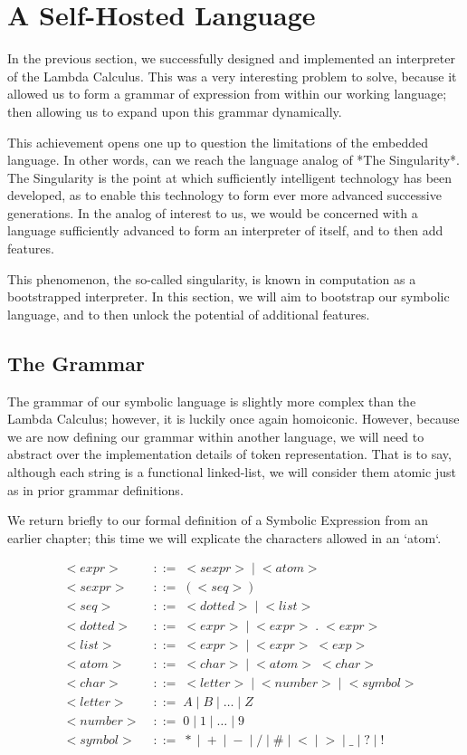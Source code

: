
\chapter{A Self-Hosted Language}
In the previous section, we successfully designed and implemented an
interpreter of the Lambda Calculus. This was a very interesting problem to
solve, because it allowed us to form a grammar of expression from within our working language; then allowing us to expand upon this grammar dynamically.

This achievement opens one up to question the limitations of the embedded
language. In other words, can we reach the language analog of *The 
Singularity*. The Singularity is the point at which sufficiently intelligent 
technology has been developed, as to enable this technology to form ever more 
advanced successive generations. In the analog of interest to us, we would be 
concerned with a language sufficiently advanced to form an interpreter of 
itself, and to then add features.

This phenomenon, the so-called singularity, is known in computation as a 
bootstrapped interpreter. In this section, we will aim to bootstrap our 
symbolic language, and to then unlock the potential of additional features.

\section{The Grammar}
The grammar of our symbolic language is slightly more complex than the Lambda 
Calculus; however, it is luckily once again homoiconic. However, because we 
are now defining our grammar within another language, we will need to 
abstract over the implementation details of token representation. That is to 
say, although each string is a functional linked-list, we will consider them 
atomic just as in prior grammar definitions.

We return briefly to our formal definition of a Symbolic Expression from an 
earlier chapter; this time we will explicate the characters allowed in an 
`atom`.

\begin{align*}
& <expr> \; &::= \; <sexpr> \; | \; <atom>
\\& <sexpr> \; &::= \; (<seq>)
\\& <seq> \; &::= \; <dotted> \; | \; <list>
\\& <dotted> \; &::= \; <expr> \; | \; <expr> \; . \; <expr>
\\& <list> \; &::= \; <expr> \; | \; <expr> \; <exp>
\\& <atom> \; &::= \; <char> \; | \; <atom> \; <char>
\\& <char> \; &::= \; <letter> \; | \; <number> \; | \; <symbol>
\\& <letter> \; &::= \; A \; | \; B \; | \; \dots \; | \; Z
\\& <number> \; &::= \; 0 \; | \; 1 \; | \; \dots \; | \; 9
\\& <symbol> \; &::= \; * \; | \; + \; | \; - \; | \; / \; | \; \# \; | \; < \; | \; > \; | \; \_ \; | \; ? \; | \; !
\end{align*}

